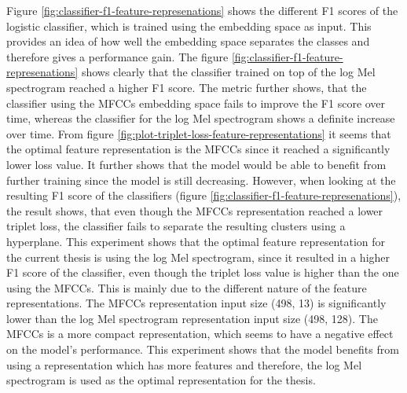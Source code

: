 Figure \ref{fig:classifier-f1-feature-represenations} shows the different F1 scores of the logistic classifier, which is trained using the embedding space as input. This provides an idea of how well the embedding space separates the classes and therefore gives a performance gain. The figure \ref{fig:classifier-f1-feature-represenations} shows clearly that the classifier trained on top of the log Mel spectrogram reached a higher F1 score. The metric further shows, that the classifier using the MFCCs embedding space fails to improve the F1 score over time, whereas the classifier for the log Mel spectrogram shows a definite increase over time.
\newline
\newline
From figure \ref{fig:plot-triplet-loss-feature-representations} it seems that the optimal feature representation is the MFCCs since it reached a significantly lower loss value. It further shows that the model would be able to benefit from further training since the model is still decreasing. However, when looking at the resulting F1 score of the classifiers (figure \ref{fig:classifier-f1-feature-represenations}), the result shows, that even though the MFCCs representation reached a lower triplet loss, the classifier fails to separate the resulting clusters using a hyperplane. 
\newline
\newline
This experiment shows that the optimal feature representation for the current thesis is using the log Mel spectrogram, since it resulted in a higher F1 score of the classifier, even though the triplet loss value is higher than the one using the MFCCs. 
\newline
\newline
This is mainly due to the different nature of the feature representations. The MFCCs representation input size (498, 13) is significantly lower than the log Mel spectrogram representation input size (498, 128). The MFCCs is a more compact representation, which seems to have a negative effect on the model's performance.
\newline
\newline
This experiment shows that the model benefits from using a representation which has more features and therefore, the log Mel spectrogram is used as the optimal representation for the thesis.

